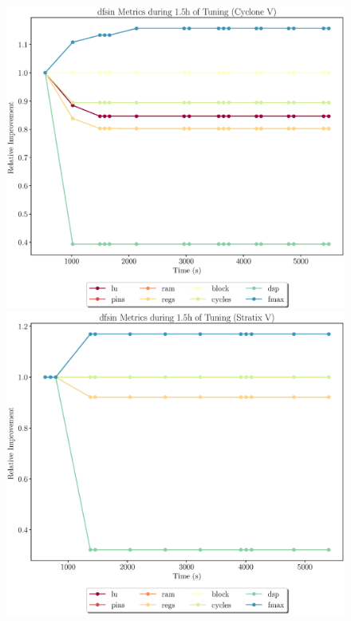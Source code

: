 \documentclass[12pt, a4paper]{article}
\begin{document}
\begin{figure}[htpb]
    \begin{minipage}{.48\textwidth}
        \includegraphics[scale=.25]{dfsin_all_5400_chstone_CycloneV}
    \end{minipage}%
    \hfill
    \begin{minipage}{.48\textwidth}
        \includegraphics[scale=.25]{dfsin_all_5400_chstone_StratixV}
    \end{minipage}%


\end{figure}
\end{document}
